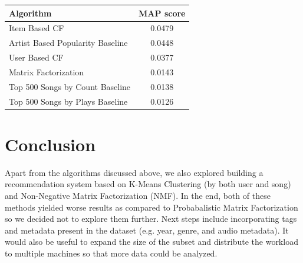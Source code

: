 \documentclass[11pt,preprint]{aastex}
\begin{document}
\begin{table}[h]
\begin{center}
\begin{tabular}{lc}
\hline
\bf{Algorithm} &  \bf{MAP score}\\ \hline
Item Based  CF  &  0.0479 \\ 
Artist Based Popularity Baseline  & 0.0448    \\ 
User Based  CF  &  0.0377 \\ 
Matrix Factorization  &   0.0143  \\ 
Top 500 Songs by Count  Baseline &  0.0138  \\ 
Top 500 Songs by Plays  Baseline &  0.0126  \\ 
\end{tabular}
\end{center}
\end{table}

\section{Conclusion}
Apart from the algorithms discussed above, we also explored building a recommendation system based on K-Means Clustering (by both user and song) and Non-Negative Matrix Factorization (NMF). In the end, both of these methods yielded worse results as compared to Probabalistic Matrix Factorization so we decided not to explore them further. Next steps include incorporating tags and metadata present in the dataset (e.g. year, genre, and audio metadata). It would also be useful to expand the size of the subset and distribute the workload to multiple machines so that more data could be analyzed.






\end{document}
